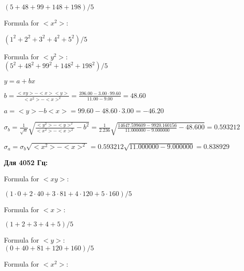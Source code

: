 \documentclass[12pt,a4paper]{article}
\begin{document}
$(5 + 48 + 99 + 148 + 198) / 5$
\vspace{0.5cm}

Formula for $<x^2>$:
\vspace{0.5cm}

$(1^2 + 2^2 + 3^2 + 4^2 + 5^2) / 5$
\vspace{0.5cm}

Formula for $<y^2>:$
\vspace{0.5cm}\\

$(5^2 + 48^2 + 99^2 + 148^2 + 198^2) / 5$
\vspace{0.5cm}



$y = a + bx$
\vspace{0.5cm}

$b = \frac{<xy> - <x><y>}{<x^2> - <x>^2} = \frac{396.00 - 3.00 \cdot 99.60}{11.00 - 9.00} = 48.60$
\vspace{0.5cm}

$a =<y> - b<x> = 99.60 - 48.60 \cdot 3.00 = -46.20$
\vspace{0.5cm}

$\sigma_b = \frac{1}{\sqrt{n}} \sqrt { \frac{<y^2> - <y>^2}{<x^2> - <x>^2}  - b^2} = \frac{1}{2.236} \sqrt {\frac{14647.599609 - 9920.160156}{11.000000 - 9.000000} - 48.600} = 0.593212$
\vspace{0.5cm}

$\sigma_a = \sigma_b \sqrt{<x^2> - <x>^2} = 0.593212 \sqrt{11.000000 - 9.000000} = 0.838929$
\vspace{0.5cm}

\textbf{Для 4052 Гц:}
\vspace{0.5cm}

Formula for $<xy>:$
\vspace{0.5cm}

$(1 \cdot 0 + 2 \cdot 40 + 3 \cdot 81 + 4 \cdot 120 + 5 \cdot 160) / 5$
\vspace{0.5cm}

Formula for $<x>:$
\vspace{0.5cm}

$(1 + 2 + 3 + 4 + 5) / 5$
\vspace{0.5cm}

Formula for $<y>:$
\vspace{0.5cm}\\

$(0 + 40 + 81 + 120 + 160) / 5$
\vspace{0.5cm}

Formula for $<x^2>$:
\vspace{0.5cm}\\
\end{document}
